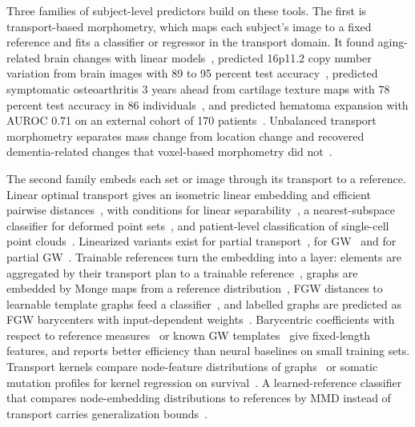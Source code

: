 \documentclass[journal,onecolumn]{IEEEtran}
\begin{document}
Three families of subject-level predictors build on these tools. The first is transport-based morphometry, which maps each subject's image to a fixed reference and fits a classifier or regressor in the transport domain. It found aging-related brain changes with linear models~\cite{Kundu2018Discovery}, predicted 16p11.2 copy number variation from brain images with 89 to 95 percent test accuracy~\cite{Kundu2024Discovering}, predicted symptomatic osteoarthritis 3 years ahead from cartilage texture maps with 78 percent test accuracy in 86 individuals~\cite{Kundu2020Enabling}, and predicted hematoma expansion with AUROC 0.71 on an external cohort of 170 patients~\cite{Ironside2025Predictive}. Unbalanced transport morphometry separates mass change from location change and recovered dementia-related changes that voxel-based morphometry did not~\cite{Gerber2018Exploratory}.

The second family embeds each set or image through its transport to a reference. Linear optimal transport gives an isometric linear embedding and efficient pairwise distances~\cite{Wang2013Linear}, with conditions for linear separability~\cite{Moosmuller2023Linear}, a nearest-subspace classifier for deformed point sets~\cite{ShifatERabbi2025Linear}, and patient-level classification of single-cell point clouds~\cite{Wang2025Linearized}. Linearized variants exist for partial transport~\cite{Bai2023Linear}, for GW~\cite{Beier2022Linear} and for partial GW~\cite{Bai2025Linear}. Trainable references turn the embedding into a layer: elements are aggregated by their transport plan to a trainable reference~\cite{Mialon2021Trainable}, graphs are embedded by Monge maps from a reference distribution~\cite{Kolouri2021Wasserstein}, FGW distances to learnable template graphs feed a classifier~\cite{VincentCuaz2022Template}, and labelled graphs are predicted as FGW barycenters with input-dependent weights~\cite{BrogatMotte2022Learning}. Barycentric coefficients with respect to reference measures~\cite{Mallery2025Synthesis} or known GW templates~\cite{DiazMartin2026Gromov} give fixed-length features, and \cite{Mallery2025Synthesis} reports better efficiency than neural baselines on small training sets. Transport kernels compare node-feature distributions of graphs~\cite{Togninalli2019Wasserstein} or somatic mutation profiles for kernel regression on survival~\cite{Little2023Associating}. A learned-reference classifier that compares node-embedding distributions to references by MMD instead of transport carries generalization bounds~\cite{Wang2024Graph}.
\end{document}
